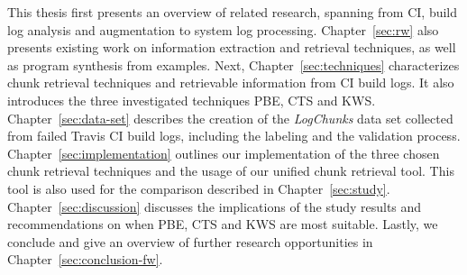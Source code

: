 \documentclass[\myrootdir/main.tex]{subfiles}
\begin{document}
This thesis first presents an overview of related research, spanning from CI, build log analysis and augmentation to system log processing.
Chapter~\ref{sec:rw} also presents existing work on information extraction and retrieval techniques, as well as program synthesis from examples.
Next, Chapter~\ref{sec:techniques} characterizes chunk retrieval techniques and retrievable information from CI build logs.
It also introduces the three investigated techniques PBE, CTS and KWS\@.
Chapter~\ref{sec:data-set} describes the creation of the \emph{LogChunks} data set collected from failed Travis CI build logs, including the labeling and the validation process.
Chapter~\ref{sec:implementation} outlines our implementation of the three chosen chunk retrieval techniques and the usage of our unified chunk retrieval tool.
This tool is also used for the comparison described in Chapter~\ref{sec:study}.
Chapter~\ref{sec:discussion} discusses the implications of the study results and recommendations on when PBE, CTS and KWS are most suitable.
Lastly, we conclude and give an overview of further research opportunities in Chapter~\ref{sec:conclusion-fw}.
\end{document}
